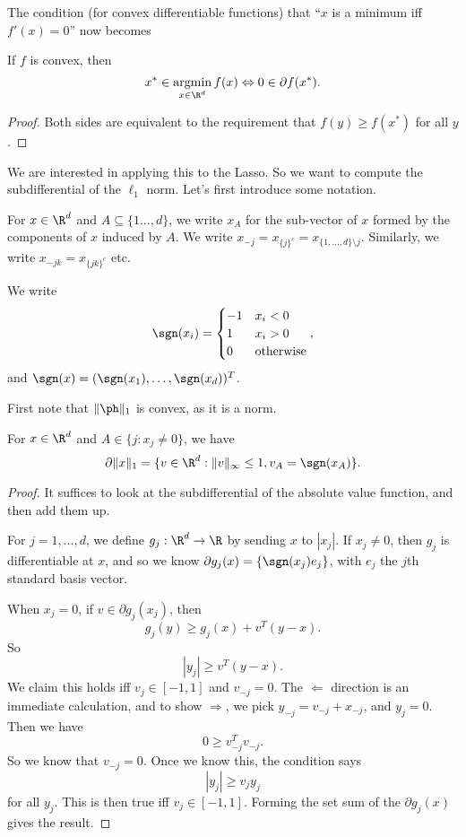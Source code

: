 \documentclass[a4paper]{article}
\DeclareMathOperator*\argmin{argmin}
\begin{document}
The condition (for convex differentiable functions) that ``$x$ is a minimum iff $f'(x) = 0$'' now becomes
\begin{prop}
  If $f$ is convex, then
  \[
    x^* \in \argmin_{x \in \R^d} f(x) \Leftrightarrow 0 \in \partial f(x^*).
  \]
\end{prop}

\begin{proof}
  Both sides are equivalent to the requirement that $f(y) \geq f(x^*)$ for all $y$.
\end{proof}

We are interested in applying this to the Lasso. So we want to compute the subdifferential of the $\ell_1$ norm. Let's first introduce some notation.

\begin{notation}
  For $x \in \R^d$ and $A \subseteq \{1 \ldots, d\}$, we write $x_A$ for the sub-vector of $x$ formed by the components of $x$ induced by $A$. We write $x_{-j} = x_{\{j\}^c} = x_{\{1, \ldots, d\} \setminus j}$. Similarly, we write $x_{-jk} = x_{\{jk\}^c}$ etc.

  We write\index{$\sgn$}
  \[
    \sgn(x_i) =
    \begin{cases}
      -1 & x_i < 0\\
      1 & x_i > 0\\
      0 & \text{otherwise}
    \end{cases},
  \]
  and $\sgn(x) = (\sgn(x_1), \ldots, \sgn(x_d))^T$.
\end{notation}

First note that $\|\ph\|_1$ is convex, as it is a norm.

\begin{prop}
  For $x \in \R^d$ and $A \in \{j: x_j \not= 0\}$, we have
  \[
    \partial \|x\|_1 = \{v \in \R^d: \|v\|_\infty \leq 1, v_A = \sgn (x_A)\}.
  \]
\end{prop}

\begin{proof}
  It suffices to look at the subdifferential of the absolute value function, and then add them up.

  For $j = 1, \ldots, d$, we define $g_j: \R^d \to \R$ by sending $x$ to $|x_j|$. If $x_j \not= 0$, then $g_j$ is differentiable at $x$, and so we know $\partial g_j (x) = \{\sgn(x_j) e_j\}$, with $e_j$ the $j$th standard basis vector.

  When $x_j = 0$, if $v \in \partial g_j(x_j)$, then
  \[
    g_j(y) \geq g_j(x) + v^T(y - x).
  \]
  So
  \[
    |y_j| \geq v^T (y - x).
  \]
  We claim this holds iff $v_j \in [-1, 1]$ and $v_{-j} = 0$. The $\Leftarrow$ direction is an immediate calculation, and to show $\Rightarrow$, we pick $y_{-j} = v_{-j} + x_{-j}$, and $y_j = 0$. Then we have
  \[
    0 \geq v_{-j}^T v_{-j}.
  \]
  So we know that $v_{-j} = 0$. Once we know this, the condition says
  \[
    |y_j| \geq v_j y_j
  \]
  for all $y_j$. This is then true iff $v_j \in [-1, 1]$. Forming the set sum of the $\partial g_j(x)$ gives the result.
\end{proof}
\end{document}
